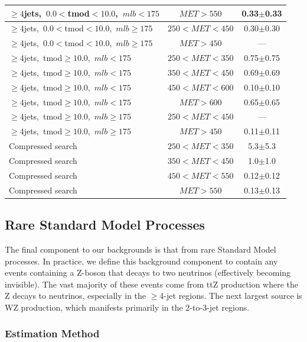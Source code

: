\begin{table}[htbp]
\begin{tabular}{|l|c|c|}
$\ge4$jets,~$0.0<$tmod$<10.0$,~$mlb<175$ & $MET>550$     &  0.33$\pm$0.33  \\
\hline
$\ge4$jets,~$0.0<$tmod$<10.0$,~$mlb\ge175$ & $250<MET<450$ &  0.30$\pm$0.30  \\
$\ge4$jets,~$0.0<$tmod$<10.0$,~$mlb\ge175$ & $MET>450$     &  ---  \\
\hline
$\ge4$jets,~tmod$\ge10.0$,~$mlb<175$ & $250<MET<350$ &  0.75$\pm$0.75  \\
$\ge4$jets,~tmod$\ge10.0$,~$mlb<175$ & $350<MET<450$ &  0.69$\pm$0.69  \\
$\ge4$jets,~tmod$\ge10.0$,~$mlb<175$ & $450<MET<600$ &  0.10$\pm$0.10 \\
$\ge4$jets,~tmod$\ge10.0$,~$mlb<175$ & $MET>600$     &  0.65$\pm$0.65  \\
\hline
$\ge4$jets,~tmod$\ge10.0$,~$mlb\ge175$ & $250<MET<450$ &  ---  \\
$\ge4$jets,~tmod$\ge10.0$,~$mlb\ge175$ & $MET>450$     &  0.11$\pm$0.11 \\
\hline
Compressed search & $250<MET<350$ & 5.3$\pm$5.3 \\
Compressed search & $350<MET<450$ & 1.0$\pm$1.0 \\
Compressed search & $450<MET<550$ & 0.12$\pm$0.12 \\
Compressed search & $MET>550$     & 0.13$\pm$0.13 \\
\hline
\end{tabular}
\end{table}

\subsection{Rare Standard Model Processes}
\label{ssec:stop:rarebkg}

The final component to our backgrounds is that from
rare Standard Model processes. In practice, we define this background
component to contain any events containing a Z-boson that decays to
two neutrinos (effectively becoming invisible). The vast majority of
these events come from ttZ production where the Z decays to
neutrinos, especially in the $\geq$4-jet regions. The next largest
source is WZ production, which manifests primarily in the 2-to-3-jet
regions.

\subsubsection{Estimation Method}
\label{sssec:stop:rarebkg:estimation}

